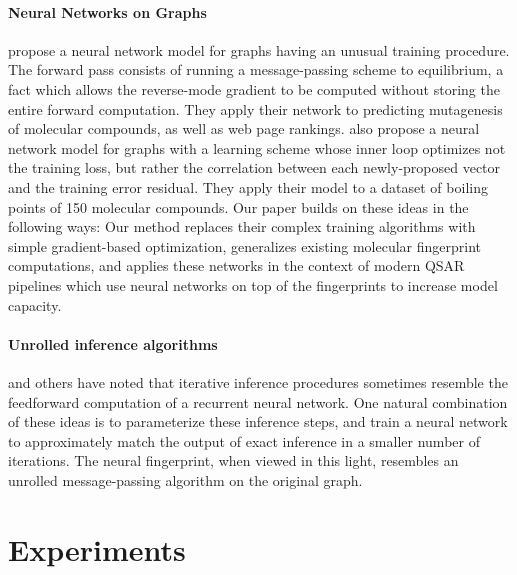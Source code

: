 \documentclass{article}
\begin{document}

\paragraph{Neural Networks on Graphs}
\cite{graphnn2009} propose a neural network model for graphs having an unusual training procedure.
The forward pass consists of running a message-passing scheme to equilibrium, a fact which allows the reverse-mode gradient to be computed without storing the entire forward computation.
They apply their network to predicting mutagenesis of molecular compounds, as well as web page rankings.
\cite{micheli2009neural} also propose a neural network model for graphs with a learning scheme whose inner loop optimizes not the training loss, but rather the correlation between each newly-proposed vector and the training error residual.
They apply their model to a dataset of boiling points of 150 molecular compounds.
Our paper builds on these ideas in the following ways:
Our method replaces their complex training algorithms with simple gradient-based optimization, generalizes existing molecular fingerprint computations, and applies these networks in the context of modern QSAR pipelines which use neural networks on top of the fingerprints to increase model capacity.

\paragraph{Unrolled inference algorithms}
\citet{hershey2014deep} and others have noted that iterative inference procedures sometimes resemble the feedforward computation of a recurrent neural network.
One natural combination of these ideas is to parameterize these inference steps, and train a neural network to approximately match the output of exact inference in a smaller number of iterations.
The neural fingerprint, when viewed in this light, resembles an unrolled message-passing algorithm on the original graph.


\section{Experiments}
\end{document}
